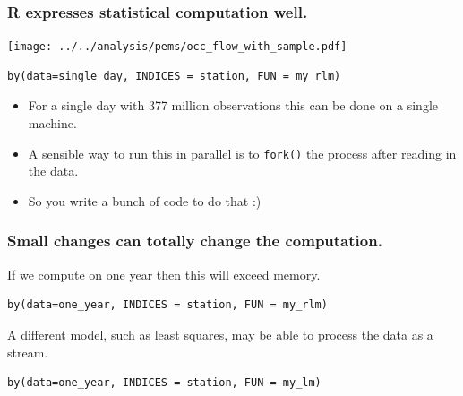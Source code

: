 \documentclass{beamer}
\begin{document}
\begin{frame}[fragile]

    \frametitle{R expresses statistical computation well.}


    \centerline{\texttt{[image: ../../analysis/pems/occ\_flow\_with\_sample.pdf]}}

\begin{verbatim}
by(data=single_day, INDICES = station, FUN = my_rlm)
\end{verbatim}

    \begin{itemize}
        \item For a single day with 377 million observations this can be
            done on a single machine.
        \item A sensible way to run this in parallel is to \texttt{fork()}
            the process after reading in the data.
        \item So you write a bunch of code to do that :)
    \end{itemize}

\end{frame}
\begin{frame}[fragile]

    \frametitle{Small changes can totally change the
    computation.}


    If we compute on one year then this will exceed memory.

\begin{verbatim}
by(data=one_year, INDICES = station, FUN = my_rlm)
\end{verbatim}

\pause 

    A different model, such as least squares, may be able to process the
    data as a stream.

\begin{verbatim}
by(data=one_year, INDICES = station, FUN = my_lm)
\end{verbatim}

\end{frame}
\end{document}
